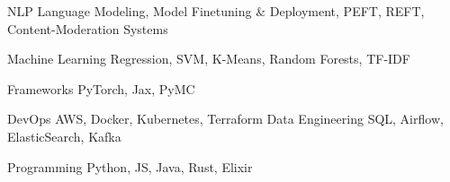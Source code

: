 

\begin{cvskills}

  \cvskill
    {NLP} %
    {Language Modeling, Model Finetuning \& Deployment, PEFT, REFT, Content-Moderation Systems} %

  \cvskill
    {Machine Learning} %
    {Regression, SVM, K-Means, Random Forests, TF-IDF} %

  \cvskill
    {Frameworks} %
    {PyTorch, Jax, PyMC} %

  \cvskill
    {DevOps} %
    {AWS, Docker, Kubernetes, Terraform} 
  \cvskill
    {Data Engineering} %
    {SQL, Airflow, ElasticSearch, Kafka} %

  \cvskill
    {Programming} %
    {Python, JS, Java, Rust, Elixir} %

\end{cvskills}